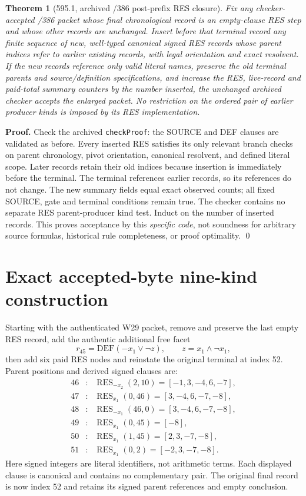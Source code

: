 \documentclass[11pt]{article}
\newtheorem{theorem}{Theorem}
\begin{document}
\begin{theorem}[595.1, archived /386 post-prefix RES closure]
Fix any checker-accepted /386 packet whose final chronological record is an empty-clause RES step and whose other records are unchanged. Insert before that terminal record any finite sequence of new, well-typed canonical signed RES records whose parent indices refer to earlier existing records, with legal orientation and exact resolvent. If the new records reference only valid literal names, preserve the old terminal parents and source/definition specifications, and increase the RES, live-record and paid-total summary counters by the number inserted, the \emph{unchanged} archived checker accepts the enlarged packet. No restriction on the ordered pair of earlier producer kinds is imposed by its RES implementation.
\end{theorem}
\noindent\textbf{Proof.} Check the archived \texttt{checkProof}: the SOURCE and DEF clauses are validated as before. Every inserted RES satisfies its only relevant branch checks on parent chronology, pivot orientation, canonical resolvent, and defined literal scope. Later records retain their old indices because insertion is immediately before the terminal. The terminal references earlier records, so its references do not change. The new summary fields equal exact observed counts; all fixed SOURCE, gate and terminal conditions remain true. The checker contains no separate RES parent-producer kind test. Induct on the number of inserted records. This proves acceptance by this \emph{specific code}, not soundness for arbitrary source formulas, historical rule completeness, or proof optimality. \qed

\section*{Exact accepted-byte nine-kind construction}
Starting with the authenticated W29 packet, remove and preserve the last empty RES record, add the authentic additional free facet
\[
 r_{45}=\mathrm{DEF}(-x_1\vee\neg z),\qquad z=x_1\wedge\neg x_1,
\]
then add six paid RES nodes and reinstate the original terminal at index 52. Parent positions and derived signed clauses are:
\[
\begin{array}{rcl}
46&:& \operatorname{RES}_{-x_2}(2,10)=[-1,3,-4,6,-7],\\
47&:& \operatorname{RES}_{x_1}(0,46)=[3,-4,6,-7,-8],\\
48&:& \operatorname{RES}_{-x_1}(46,0)=[3,-4,6,-7,-8],\\
49&:& \operatorname{RES}_{x_1}(0,45)=[-8],\\
50&:& \operatorname{RES}_{x_1}(1,45)=[2,3,-7,-8],\\
51&:& \operatorname{RES}_{x_1}(0,2)=[-2,3,-7,-8].
\end{array}
\]
Here signed integers are literal identifiers, not arithmetic terms. Each displayed clause is canonical and contains no complementary pair. The original final record is now index 52 and retains its signed parent references and empty conclusion.
\end{document}
